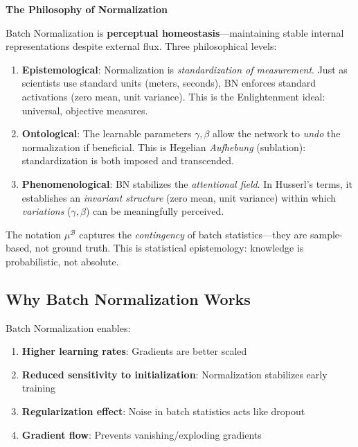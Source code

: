 \begin{philobox}
	\textbf{The Philosophy of Normalization}
	
	Batch Normalization is \textbf{perceptual homeostasis}---maintaining stable internal representations despite external flux. Three philosophical levels:
	
	\begin{enumerate}
		\item \textbf{Epistemological}: Normalization is \textit{standardization of measurement}. Just as scientists use standard units (meters, seconds), BN enforces standard activations (zero mean, unit variance). This is the Enlightenment ideal: universal, objective measures.
		
		\item \textbf{Ontological}: The learnable parameters $\gamma, \beta$ allow the network to \textit{undo} the normalization if beneficial. This is Hegelian \textit{Aufhebung} (sublation): standardization is both imposed and transcended.
		
		\item \textbf{Phenomenological}: BN stabilizes the \textit{attentional field}. In Husserl's terms, it establishes an \textit{invariant structure} (zero mean, unit variance) within which \textit{variations} ($\gamma, \beta$) can be meaningfully perceived.
	\end{enumerate}
	
	The notation $\mu^{\mathcal{B}}$ captures the \textit{contingency} of batch statistics---they are sample-based, not ground truth. This is statistical epistemology: knowledge is probabilistic, not absolute.
\end{philobox}

\subsection{Why Batch Normalization Works}

\begin{theorem}
	Batch Normalization enables:
	\begin{enumerate}
		\item \textbf{Higher learning rates}: Gradients are better scaled
		\item \textbf{Reduced sensitivity to initialization}: Normalization stabilizes early training
		\item \textbf{Regularization effect}: Noise in batch statistics acts like dropout
		\item \textbf{Gradient flow}: Prevents vanishing/exploding gradients
	\end{enumerate}
\end{theorem}

